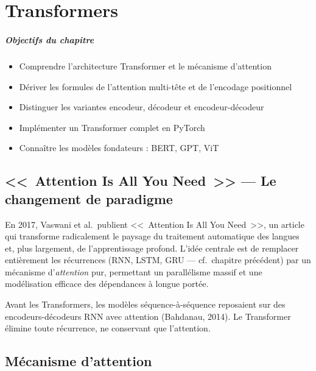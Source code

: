 \chapter{Transformers}
\label{ch:transformers}

\paragraph{Objectifs du chapitre}
\begin{itemize}
\item Comprendre l'architecture Transformer et le m\'ecanisme d'attention
\item D\'eriver les formules de l'attention multi-t\^ete et de l'encodage positionnel
\item Distinguer les variantes encodeur, d\'ecodeur et encodeur-d\'ecodeur
\item Impl\'ementer un Transformer complet en PyTorch
\item Conna\^itre les mod\`eles fondateurs : BERT, GPT, ViT
\end{itemize}

\section{<<~Attention Is All You Need~>> --- Le changement de paradigme}
\label{sec:transformers-intro}

En 2017, Vaswani et al.\ publient <<~Attention Is All You Need~>>, un article qui transforme radicalement le paysage du traitement automatique des langues et, plus largement, de l'apprentissage profond. L'id\'ee centrale est de remplacer enti\`erement les r\'ecurrences (RNN, LSTM, GRU --- cf.\ chapitre pr\'ec\'edent) par un m\'ecanisme d'\emph{attention} pur, permettant un parall\'elisme massif et une mod\'elisation efficace des d\'ependances \`a longue port\'ee.

\begin{remarque}
Avant les Transformers, les mod\`eles s\'equence-\`a-s\'equence reposaient sur des encodeurs-d\'ecodeurs RNN avec attention (Bahdanau, 2014). Le Transformer \'elimine toute r\'ecurrence, ne conservant que l'attention.
\end{remarque}

\section{M\'ecanisme d'attention}
\label{sec:attention-mechanism}

